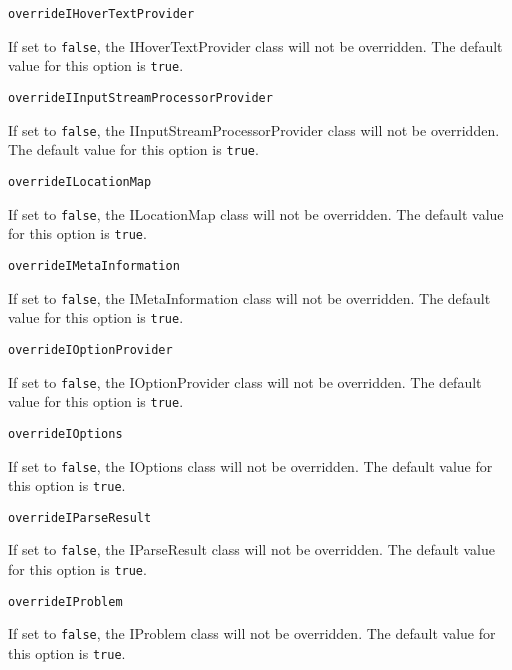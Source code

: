 \noindent\texttt{overrideIHoverTextProvider}
\begin{myindentpar}{1cm}
If set to \texttt{false}, the IHoverTextProvider class will not be overridden. The default value for this option is \texttt{true}.
\end{myindentpar}

\noindent\texttt{overrideIInputStreamProcessorProvider}
\begin{myindentpar}{1cm}
If set to \texttt{false}, the IInputStreamProcessorProvider class will not be overridden. The default value for this option is \texttt{true}.
\end{myindentpar}

\noindent\texttt{overrideILocationMap}
\begin{myindentpar}{1cm}
If set to \texttt{false}, the ILocationMap class will not be overridden. The default value for this option is \texttt{true}.
\end{myindentpar}

\noindent\texttt{overrideIMetaInformation}
\begin{myindentpar}{1cm}
If set to \texttt{false}, the IMetaInformation class will not be overridden. The default value for this option is \texttt{true}.
\end{myindentpar}

\noindent\texttt{overrideIOptionProvider}
\begin{myindentpar}{1cm}
If set to \texttt{false}, the IOptionProvider class will not be overridden. The default value for this option is \texttt{true}.
\end{myindentpar}

\noindent\texttt{overrideIOptions}
\begin{myindentpar}{1cm}
If set to \texttt{false}, the IOptions class will not be overridden. The default value for this option is \texttt{true}.
\end{myindentpar}

\noindent\texttt{overrideIParseResult}
\begin{myindentpar}{1cm}
If set to \texttt{false}, the IParseResult class will not be overridden. The default value for this option is \texttt{true}.
\end{myindentpar}

\noindent\texttt{overrideIProblem}
\begin{myindentpar}{1cm}
If set to \texttt{false}, the IProblem class will not be overridden. The default value for this option is \texttt{true}.
\end{myindentpar}

